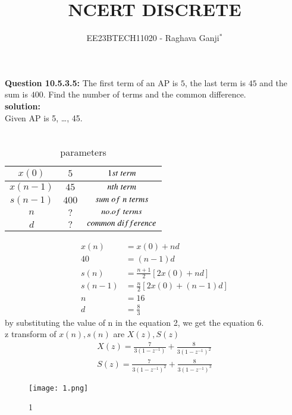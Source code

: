 \documentclass[journal,12pt,twocolumn]{IEEEtran}
\theoremstyle{remark}
\begin{document}

\vspace{3cm}

\title{NCERT DISCRETE}
\author{EE23BTECH11020 - Raghava Ganji$^{*}$%
}
\maketitle
\newpage
\bigskip

\renewcommand{\thefigure}{\theenumi}
\renewcommand{\thetable}{\theenumi}

\textbf{Question 10.5.3.5:}
The first term of an AP is $5$, the last term is $45$ and the sum is $400$. Find the number of terms and the common difference.\\
\textbf{solution:}\\
Given AP is 5, \ldots, 45.\\\\
\begin{table}[h]
\centering
\begin{tabular}{|c|c|c|}\hline
$x(0)$ & $5$ & $ 1st\hspace{1mm}term$\\ \hline
$x(n-1)$ & $45$ & $nth\hspace{1mm}term$\\ \hline
$s(n-1)$ & $400$ & $sum\hspace{1mm}of\hspace{1mm}n\hspace{1mm}terms$\\ \hline
$n$ & $?$ & $no.of\hspace{1mm}terms$\\ \hline
$d$ & $?$ & $common\hspace{1mm}difference$\\ \hline
\end{tabular}
\caption{parameters}
\end{table}
\begin{align}
x(n)&=x(0)+nd\\
40&=(n-1)d\\
s(n)&=\frac{n+1}{2} [2x(0)+nd]\\
s(n-1)&=\frac{n}{2} [2x(0)+(n-1)d]\\
n&=16\\
d&=\frac{8}{3}
\end{align}
by substituting the value of n in the equation 2, we get the equation 6.\\
z transform of $x(n),s(n)$ are $X(z),S(z)$
\begin{align}
X(z)=\frac{7}{3(1-z^{-1})}+\frac{8}{3(1-z^{-1})^2}\\
S(z)=\frac{7}{3(1-z^{-1})^2}+\frac{8}{3(1-z^{-1})^3}
\end{align}
\begin{figure}
    \centering
    \texttt{[image: 1.png]}
    \caption{1}
    \label{fig:enter-label}
\end{figure}
\end{document}
